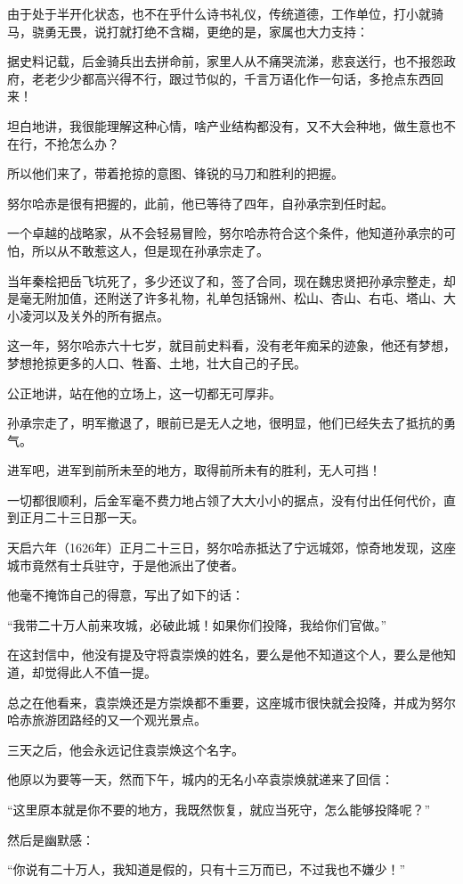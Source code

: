 \begin{multicols}{\theparacolNo}
由于处于半开化状态，也不在乎什么诗书礼仪，传统道德，工作单位，打小就骑马，骁勇无畏，说打就打绝不含糊，更绝的是，家属也大力支持：

据史料记载，后金骑兵出去拼命前，家里人从不痛哭流涕，悲哀送行，也不报怨政府，老老少少都高兴得不行，跟过节似的，千言万语化作一句话，多抢点东西回来！

坦白地讲，我很能理解这种心情，啥产业结构都没有，又不大会种地，做生意也不在行，不抢怎么办？

所以他们来了，带着抢掠的意图、锋锐的马刀和胜利的把握。

努尔哈赤是很有把握的，此前，他已等待了四年，自孙承宗到任时起。

一个卓越的战略家，从不会轻易冒险，努尔哈赤符合这个条件，他知道孙承宗的可怕，所以从不敢惹这人，但是现在孙承宗走了。

当年秦桧把岳飞坑死了，多少还议了和，签了合同，现在魏忠贤把孙承宗整走，却是毫无附加值，还附送了许多礼物，礼单包括锦州、松山、杏山、右屯、塔山、大小凌河以及关外的所有据点。

这一年，努尔哈赤六十七岁，就目前史料看，没有老年痴呆的迹象，他还有梦想，梦想抢掠更多的人口、牲畜、土地，壮大自己的子民。

公正地讲，站在他的立场上，这一切都无可厚非。

孙承宗走了，明军撤退了，眼前已是无人之地，很明显，他们已经失去了抵抗的勇气。

进军吧，进军到前所未至的地方，取得前所未有的胜利，无人可挡！

一切都很顺利，后金军毫不费力地占领了大大小小的据点，没有付出任何代价，直到正月二十三日那一天。

天启六年（1626年）正月二十三日，努尔哈赤抵达了宁远城郊，惊奇地发现，这座城市竟然有士兵驻守，于是他派出了使者。

他毫不掩饰自己的得意，写出了如下的话：

“我带二十万人前来攻城，必破此城！如果你们投降，我给你们官做。”

在这封信中，他没有提及守将袁崇焕的姓名，要么是他不知道这个人，要么是他知道，却觉得此人不值一提。

总之在他看来，袁崇焕还是方崇焕都不重要，这座城市很快就会投降，并成为努尔哈赤旅游团路经的又一个观光景点。

三天之后，他会永远记住袁崇焕这个名字。

他原以为要等一天，然而下午，城内的无名小卒袁崇焕就递来了回信：

“这里原本就是你不要的地方，我既然恢复，就应当死守，怎么能够投降呢？”

然后是幽默感：

“你说有二十万人，我知道是假的，只有十三万而已，不过我也不嫌少！”

\ifnum{}
	\end{multicols}
\fi
\newpage
